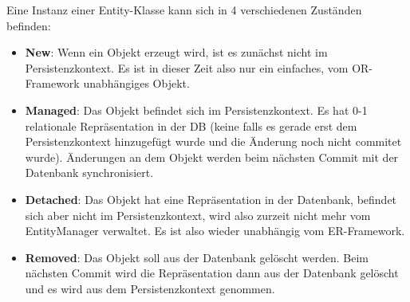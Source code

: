 Eine Instanz einer Entity-Klasse kann sich in 4 verschiedenen Zuständen befinden:
\begin{itemize}
    \item \textbf{New}: Wenn ein Objekt erzeugt wird, ist es zunächst nicht im Persistenzkontext. Es ist in dieser Zeit also nur ein einfaches, vom OR-Framework unabhängiges Objekt.
    \item \textbf{Managed}: Das Objekt befindet sich im Persistenzkontext. Es hat 0-1 relationale Repräsentation in der DB (keine falls es gerade erst dem Persistenzkontext hinzugefügt wurde und die Änderung noch nicht commitet wurde). Änderungen an dem Objekt werden beim nächsten Commit mit der Datenbank synchronisiert.
    \item \textbf{Detached}: Das Objekt hat eine Repräsentation in der Datenbank, befindet sich aber nicht im Persistenzkontext, wird also zurzeit nicht mehr vom EntityManager verwaltet. Es ist also wieder unabhängig vom ER-Framework.
    \item \textbf{Removed}: Das Objekt soll aus der Datenbank gelöscht werden. Beim nächsten Commit wird die Repräsentation dann aus der Datenbank gelöscht und es wird aus dem Persistenzkontext genommen.
\end{itemize}


